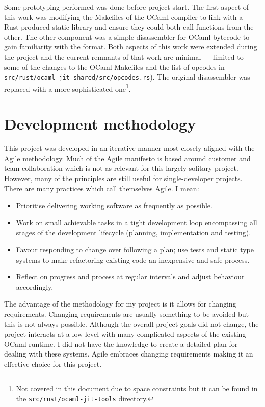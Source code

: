 Some prototyping performed was done before project start.  The first aspect of this work was
modifying
the Makefiles of the OCaml compiler to link with a
Rust-produced static library and ensure they could both call functions from the other. The other
component was a simple disassembler for OCaml bytecode to gain familiarity with the format. Both
aspects of this work were extended during the project and the current remnants of that work are
minimal --- limited to some of the changes to the OCaml Makefiles and the list of opcodes in
\texttt{src/rust/ocaml-jit-shared/src/opcodes.rs}).  The original disassembler was replaced with a
more sophisticated one\footnote{Not covered in this document due to space constraints but it
    can be found in the \texttt{src/rust/ocaml-jit-tools} directory.}.

\section{Development methodology} \label{dev-methodology}

This project was developed in an iterative manner most closely aligned with the Agile
methodology. Much of the Agile manifesto is based around customer and team collaboration which is
not as relevant for this largely solitary project. However, many of the principles are still useful
for single-developer projects. There are many practices which call themselves Agile. I mean:

\begin{itemize}
    \item Prioritise delivering working software as frequently as possible.
    \item Work on small achievable tasks in a tight development loop encompassing all stages of
          the
          development lifecycle (planning, implementation and testing).
    \item Favour responding to change over following a plan; use tests and static type systems to
          make refactoring existing code an inexpensive and safe process.
    \item Reflect on progress and process at regular intervals and adjust behaviour accordingly.
\end{itemize}

The advantage of the methodology for my project is it allows for changing requirements. Changing
requirements are  usually something to be avoided but this is not always possible.  Although the
overall project goals did not change, the project interacts at a low level with many complicated
aspects of the existing OCaml runtime. I did not have the knowledge to create a detailed plan for
dealing with these systems. Agile embraces changing requirements making it an effective choice for
this project.

